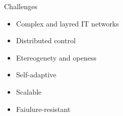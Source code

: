 \begin{frame}{Challenges}
  \begin{card}
    \begin{itemize}
      \item Complex and layred IT networks
      \item Distributed control
      \item Etereogenety and openess
    \end{itemize}
  \end{card}
  \begin{card}
    \begin{itemize}
      \item[\faThumbsUp] Self-adaptive
      \item[\faThumbsUp] Scalable
      \item[\faThumbsUp] Faiulure-resistant 
    \end{itemize}
  \end{card}
\end{frame}